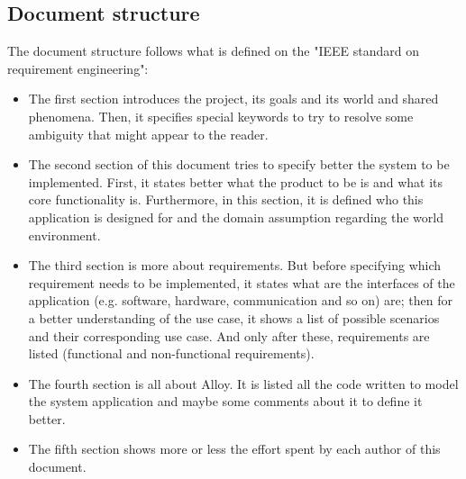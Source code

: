 \subsection{Document structure}
The document structure follows what is defined on the "IEEE standard on requirement engineering":
\begin{itemize}
\item The first section introduces the project, its goals and its world and shared phenomena. Then, it specifies special keywords to try to resolve some ambiguity that might appear to the reader.
\item The second section of this document tries to specify better the system to be implemented. First, it states better what the product to be is and what its core functionality is. Furthermore, in this section, it is defined who this application is designed for and the domain assumption regarding the world environment.
\item The third section is more about requirements. But before specifying which requirement needs to be implemented, it states what are the interfaces of the application (e.g. software, hardware, communication and so on) are; then for a better understanding of the use case, it shows a list of possible scenarios and their corresponding use case. And only after these, requirements are listed (functional and non-functional requirements).
\item The fourth section is all about Alloy. It is listed all the code written to model the system application and maybe some comments about it to define it better.
\item The fifth section shows more or less the effort spent by each author of this document.
\end{itemize}